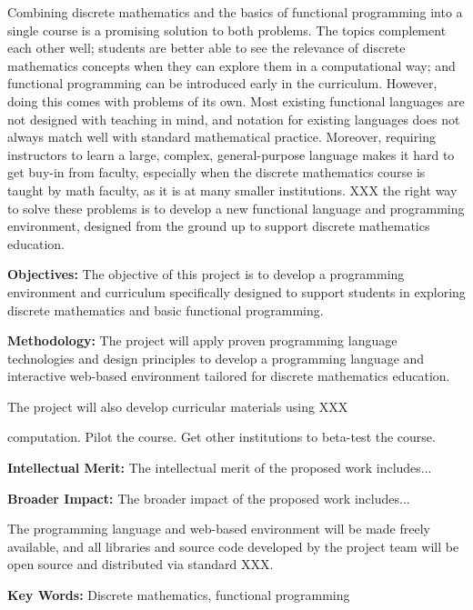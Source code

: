 Combining discrete mathematics and the basics of functional
programming into a single course is a promising solution to both
problems.  The topics complement each other well; students are better
able to see the relevance of discrete mathematics concepts when they
can explore them in a computational way; and functional programming
can be introduced early in the curriculum.  However, doing this comes
with problems of its own. Most existing functional languages are not
designed with teaching in mind, and notation for existing languages
does not always match well with standard mathematical practice.
Moreover, requiring instructors to learn a large, complex,
general-purpose language makes it hard to get buy-in from faculty,
especially when the discrete mathematics course is taught by math
faculty, as it is at many smaller institutions. XXX the right way to
solve these problems is to develop a new functional language and
programming environment, designed from the ground up to support
discrete mathematics education.

{\bf Objectives: } The objective of this project is to develop a
programming environment and curriculum specifically designed to
support students in exploring discrete mathematics and basic
functional programming.

{\bf Methodology: } The project will apply proven programming language
technologies and design principles to develop a programming language
and interactive web-based environment tailored for discrete
mathematics education.

The project will also develop curricular materials using XXX

computation.  Pilot the course.  Get other institutions to beta-test
the course.

{\bf Intellectual Merit:} The intellectual merit of the proposed work
includes...

{\bf Broader Impact: } The broader impact of the proposed work
includes...

The programming language and web-based environment will be made freely
available, and all libraries and source code developed by the project
team will be open source and distributed via standard XXX.

{\bf Key Words:} Discrete mathematics, functional programming


